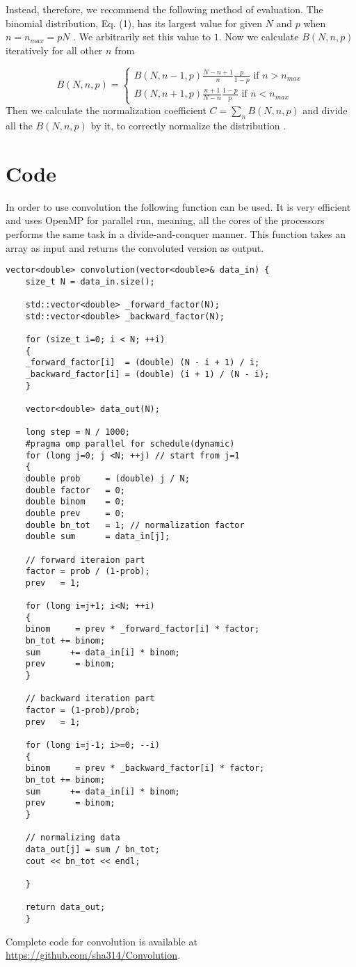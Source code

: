 	Instead, therefore, we recommend the following method of evaluation. The binomial distribution, Eq. (1), has its largest value for given $N$ and $p$ when $n = n_{max} = p N$ . We arbitrarily set this value to $1$. Now we calculate $B(N, n, p)$ iteratively for all other $n$ from
	
	\begin{equation*}
	B(N,n,p) = 
	\begin{cases}
		B(N, n-1, p) \frac{N-n+1}{n} \frac{p}{1-p}  \text{ if } n > n_{max}\\
		B(N, n+1, p) \frac{n+1}{N-n} \frac{1-p}{p}  \text{ if } n < n_{max}
	\end{cases}   
	\end{equation*}
	Then we calculate the normalization coefficient $C = \sum_{n} B(N, n, p)$ and divide all the $B(N, n, p)$ by it, to correctly normalize the distribution 	\cite{Newman2000, Newman2001}.
	
\section{Code}
	In order to use convolution the following function can be used. It is very efficient and uses OpenMP for parallel run, meaning, all the cores of the processors performs the same task in a divide-and-conquer manner. This function takes an array as input and returns the convoluted version as output.
	\begin{lstlisting}[style=CStyle]
	vector<double> convolution(vector<double>& data_in) {
	size_t N = data_in.size();
	
	std::vector<double> _forward_factor(N);
	std::vector<double> _backward_factor(N);
	
	for (size_t i=0; i < N; ++i)
	{
	_forward_factor[i]  = (double) (N - i + 1) / i;
	_backward_factor[i] = (double) (i + 1) / (N - i);
	}
	
	vector<double> data_out(N);

	long step = N / 1000;
	#pragma omp parallel for schedule(dynamic)
	for (long j=0; j <N; ++j) // start from j=1
	{
	double prob     = (double) j / N;
	double factor   = 0;
	double binom    = 0;
	double prev     = 0;
	double bn_tot   = 1; // normalization factor
	double sum      = data_in[j];
	
	// forward iteraion part
	factor = prob / (1-prob);
	prev   = 1;
	
	for (long i=j+1; i<N; ++i)
	{
	binom     = prev * _forward_factor[i] * factor;
	bn_tot += binom;
	sum      += data_in[i] * binom;
	prev      = binom;
	}
	
	// backward iteration part
	factor = (1-prob)/prob;
	prev   = 1;
	
	for (long i=j-1; i>=0; --i)
	{
	binom     = prev * _backward_factor[i] * factor;
	bn_tot += binom;
	sum      += data_in[i] * binom;
	prev      = binom;
	}
	
	// normalizing data
	data_out[j] = sum / bn_tot;
	cout << bn_tot << endl;
	
	}

	return data_out;
	}
	\end{lstlisting}
Complete code for convolution is available at 
\url{https://github.com/sha314/Convolution}.\\

